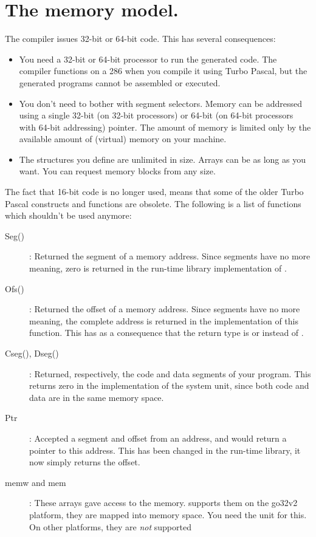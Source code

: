 \section{The memory model.}
\label{se:ThirtytwoBit}
The \fpc compiler issues 32-bit or 64-bit code.
This has several consequences:
\begin{itemize}
\item You need a 32-bit or 64-bit processor to run the generated code. The
compiler functions on a 286 when you compile it using Turbo Pascal,
but the generated programs cannot be assembled or executed.
\item You don't need to bother with segment selectors. Memory can be
addressed using a single 32-bit (on 32-bit processors) or 64-bit (on
64-bit processors with 64-bit addressing) pointer.
The amount of memory is limited only by the available amount of (virtual)
memory on your machine.
\item The structures you define are unlimited in size. Arrays can be as long
as you want. You can request memory blocks from any size.
\end{itemize}

The fact that 16-bit code is no longer used, means that some of the older
Turbo Pascal constructs and functions are obsolete. The following is a
list of functions which shouldn't be used anymore:
\begin{description}
\item [Seg()]: Returned the segment of a memory address. Since segments have
no more meaning, zero is returned in the \fpc run-time library implementation of
.
\item [Ofs()]: Returned the offset of a memory address. Since segments have
no more meaning, the complete address is returned in the \fpc implementation
of this function. This has as a consequence that the return type is
 or  instead of .
\item [Cseg(), Dseg()]: Returned, respectively, the code and data segments
of your program.  This returns zero in the \fpc implementation of the
system unit, since both code and data are in the same memory space.
\item [Ptr]: Accepted a segment and offset from an address, and would return
a pointer to this address. This has been changed in the run-time library, it
now simply returns the offset.
\item [memw and mem]: These arrays gave access to the \dos memory. \fpc
supports them on the go32v2 platform, they are mapped into \dos memory
space. You need the  unit for this. On other platforms, they are
{\em not} supported
\end{description}

